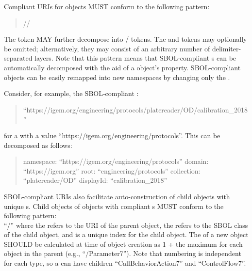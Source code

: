 Compliant URIs for  objects MUST conform to the following pattern:
\begin{quotation} 
//
\end{quotation}

The  token MAY further decompose into / tokens. The  and  tokens may optionally be omitted; alternatively, they may consist of an arbitrary number of delimiter-separated layers. Note that this pattern means that SBOL-compliant s can be automatically decomposed with the aid of a  object's  property. SBOL-compliant objects can be easily remapped into new namespaces by changing only the .

Consider, for example, the SBOL-compliant :
\begin{quote}``https://igem.org/engineering/protocols/platereader/OD/calibration\_2018''\end{quote} 
for a  with a  value ``https://igem.org/engineering/protocols''.
This  can be decomposed as follows:
\begin{quote} 
namespace: ``https://igem.org/engineering/protocols'' \linebreak
domain: ``https://igem.org'' \linebreak
root: ``engineering/protocols'' \linebreak
collection: ``platereader/OD'' \linebreak
displayId: ``calibration\_2018'' \linebreak
\end{quote}

SBOL-compliant URIs also facilitate auto-construction of child objects with unique s. 
Child objects of  objects with compliant s MUST conform to the following pattern:\\ ``/'' where the  refers to the URI of the parent object, the  refers to the SBOL class of the child object, and  is a unique index for the child object. 
The  of a new object SHOULD be calculated at time of object creation as 1 + the maximum  for each  object in the parent (e.g., ``/Parameter7''). 
Note that numbering is independent for each type, so a  can have children ``CallBehaviorAction7'' and ``ControlFlow7''.

